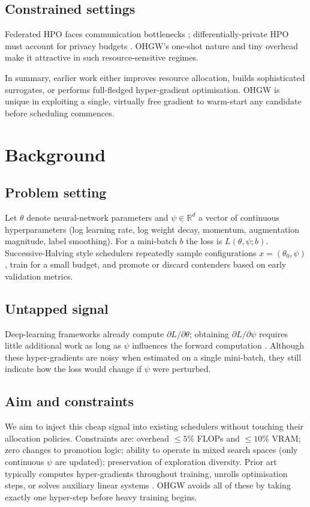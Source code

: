 \documentclass{article}
\begin{document}
\subsection{Constrained settings}
Federated HPO faces communication bottlenecks \cite{khodak-2021-federated}; differentially-private HPO must account for privacy budgets \cite{panda-2022-new,wang-2023-hypo}. OHGW’s one-shot nature and tiny overhead make it attractive in such resource-sensitive regimes.

In summary, earlier work either improves resource allocation, builds sophisticated surrogates, or performs full-fledged hyper-gradient optimisation. OHGW is unique in exploiting a single, virtually free gradient to warm-start any candidate before scheduling commences.

\section{Background}
\subsection{Problem setting}
Let \(\theta\) denote neural-network parameters and \(\psi\in\mathbb{R}^d\) a vector of continuous hyperparameters (log learning rate, log weight decay, momentum, augmentation magnitude, label smoothing). For a mini-batch \(b\) the loss is \(L(\theta,\psi; b)\). Successive-Halving style schedulers repeatedly sample configurations \(x=(\theta_0,\psi)\), train for a small budget, and promote or discard contenders based on early validation metrics.

\subsection{Untapped signal}
Deep-learning frameworks already compute \(\partial L/\partial \theta\); obtaining \(\partial L/\partial \psi\) requires little additional work as long as \(\psi\) influences the forward computation \cite{chandra-2019-gradient}. Although these hyper-gradients are noisy when estimated on a single mini-batch, they still indicate how the loss would change if \(\psi\) were perturbed.

\subsection{Aim and constraints}
We aim to inject this cheap signal into existing schedulers without touching their allocation policies. Constraints are: overhead \(\leq 5 \%\) FLOPs and \(\leq 10 \%\) VRAM; zero changes to promotion logic; ability to operate in mixed search spaces (only continuous \(\psi\) are updated); preservation of exploration diversity. Prior art typically computes hyper-gradients throughout training, unrolls optimisation steps, or solves auxiliary linear systems \cite{bertrand-2020-implicit,immer-2023-stochastic}. OHGW avoids all of these by taking exactly one hyper-step before heavy training begins.
\end{document}
